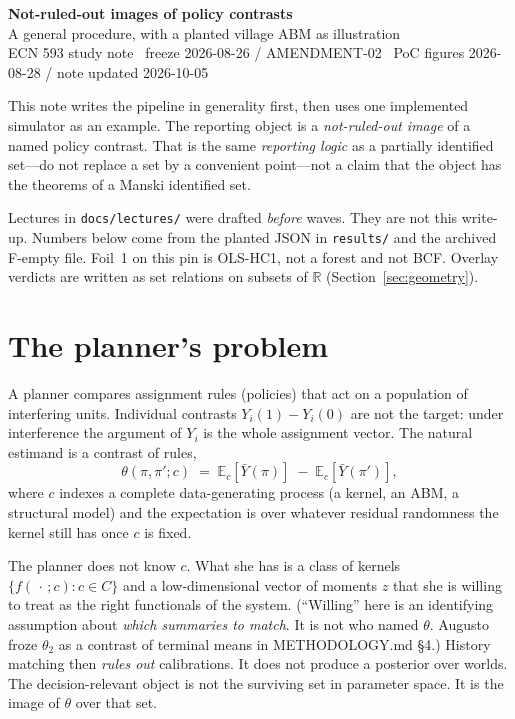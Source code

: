 \documentclass[11pt]{article}
\begin{document}
{\centering
{\large\bfseries Not-ruled-out images of policy contrasts}\\[0.35em]
{\small A general procedure, with a planted village ABM as illustration}\\[0.45em]
{\small ECN 593 study note \textperiodcentered\ freeze 2026-08-26 / AMENDMENT-02
\textperiodcentered\ PoC figures 2026-08-28 / note updated 2026-10-05}\\[0.8em]
}

\noindent
This note writes the pipeline in generality first, then uses one
implemented simulator as an example. The reporting object is a
\emph{not-ruled-out image} of a named policy contrast. That is the same
\emph{reporting logic} as a partially identified set---do not replace a
set by a convenient point---not a claim that the object has the
theorems of a Manski identified set.

Lectures in \texttt{docs/lectures/} were drafted \emph{before} waves.
They are not this write-up. Numbers below come from the planted JSON
in \texttt{results/} and the archived F-empty file. Foil~1 on this pin
is OLS-HC1, not a forest and not BCF. Overlay verdicts are written as
set relations on subsets of \(\mathbb{R}\) (Section~\ref{sec:geometry}).

\section{The planner's problem}

A planner compares assignment rules (policies) that act on a population
of interfering units. Individual contrasts $Y_i(1)-Y_i(0)$ are not the
target: under interference the argument of $Y_i$ is the whole assignment
vector. The natural estimand is a contrast of rules,
\begin{equation}
  \theta(\pi,\pi';c)
  \;=\;
  \mathbb{E}_c\!\left[\bar Y(\pi)\right]
  \;-\;
  \mathbb{E}_c\!\left[\bar Y(\pi')\right],
\end{equation}
where $c$ indexes a complete data-generating process (a kernel, an ABM,
a structural model) and the expectation is over whatever residual
randomness the kernel still has once $c$ is fixed.

The planner does not know $c$. What she has is a class of kernels
$\{f(\,\cdot\,;c):c\in C\}$ and a low-dimensional vector of moments $z$
that she is willing to treat as the right functionals of the system.
(``Willing'' here is an identifying assumption about \emph{which
summaries to match}. It is not who named $\theta$. Augusto froze
$\theta_2$ as a contrast of terminal means in METHODOLOGY.md §4.)
History matching then \emph{rules out} calibrations. It does not
produce a posterior over worlds. The decision-relevant object is not
the surviving set in parameter space. It is the image of $\theta$ over
that set.
\end{document}

